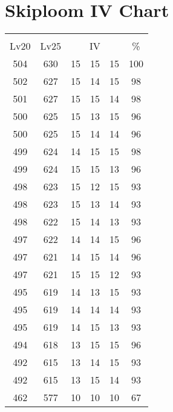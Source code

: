 \documentclass{article}%
\begin{document}
%
\normalsize%
\section{Skiploom IV Chart}%
\label{sec:Skiploom IV Chart}%
\renewcommand{\arraystretch}{1.5}%
\begin{tabular}{|c|c|c|c|c|c|}%
\hline%
\multicolumn{6}{|c|}{\textcolor{white}{ 
\linebreak{Skiploom}
}%
\cellcolor{black}}\\%
\multicolumn{1}{|c}{Lv20}&\multicolumn{1}{c|}{Lv25}&\multicolumn{3}{c|}{IV}&\multicolumn{1}{|c|}{\%}\\%
\hline%
\rowcolor{color100}%
504&630&15&15&15&100\\%
\hline%
\rowcolor{color98}%
502&627&15&14&15&98\\%
\hline%
\rowcolor{color98}%
501&627&15&15&14&98\\%
\hline%
\rowcolor{color96}%
500&625&15&13&15&96\\%
\hline%
\rowcolor{color96}%
500&625&15&14&14&96\\%
\hline%
\rowcolor{color98}%
499&624&14&15&15&98\\%
\hline%
\rowcolor{color96}%
499&624&15&15&13&96\\%
\hline%
\rowcolor{color93}%
498&623&15&12&15&93\\%
\hline%
\rowcolor{color93}%
498&623&15&13&14&93\\%
\hline%
\rowcolor{color93}%
498&622&15&14&13&93\\%
\hline%
\rowcolor{color96}%
497&622&14&14&15&96\\%
\hline%
\rowcolor{color96}%
497&621&14&15&14&96\\%
\hline%
\rowcolor{color93}%
497&621&15&15&12&93\\%
\hline%
\rowcolor{color93}%
495&619&14&13&15&93\\%
\hline%
\rowcolor{color93}%
495&619&14&14&14&93\\%
\hline%
\rowcolor{color93}%
495&619&14&15&13&93\\%
\hline%
\rowcolor{color96}%
494&618&13&15&15&96\\%
\hline%
\rowcolor{color93}%
492&615&13&14&15&93\\%
\hline%
\rowcolor{color93}%
492&615&13&15&14&93\\%
\hline%
\rowcolor{color91}%
462&577&10&10&10&67\\%
\end{tabular}

%
\end{document}
